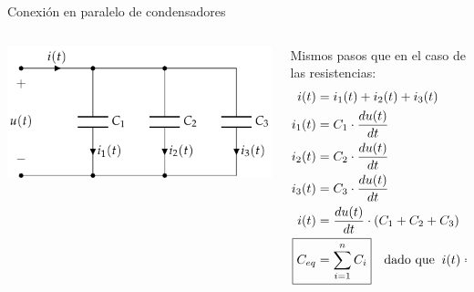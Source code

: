 \documentclass[aspectratio=169, xcolor={usenames,svgnames,dvipsnames}]{beamer}
\begin{document}

\begin{frame}{Conexión en paralelo de condensadores}
    \begin{columns}
    \begin{column}{0.4\columnwidth}
        \vspace{-10mm}
        \begin{center}
        \includegraphics[width=1.05\linewidth]{../figs/CondensadoresParalelo.pdf}
        \end{center}
    \end{column}
    \begin{column}{0.6\columnwidth}
    Mismos pasos que en el caso de las resistencias:
    \begin{align*}
      i(t) & = i_1(t) + i_2(t) + i_3(t)\\
      i_1(t) &= C_1 \cdot \frac{du(t)}{dt}\\
      i_2(t) &= C_2 \cdot \frac{du(t)}{dt}\\
      i_3(t) &= C_3 \cdot \frac{du(t)}{dt}\\
      i(t)& = \frac{du(t)}{dt} \cdot (C_1 + C_2 + C_3)\\
      \Aboxed{C_{eq} &= \sum_{i = 1}^n C_i} \quad \textrm{dado que} \;\; i(t) = C_{eq} \cdot \frac{du(t)}{dt}
    \end{align*}
    \end{column}
    \end{columns}      
\end{frame}

\end{document}
